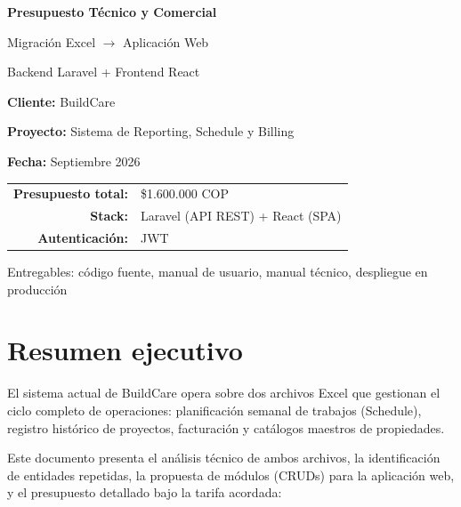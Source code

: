 \documentclass[11pt,a4paper]{article}
\newcommand{\money}[1]{\$#1}
\begin{document}
\begin{titlepage}
    \centering
    \vspace*{2cm}
    {\Huge\bfseries\color{buildcare} Presupuesto T\'ecnico y Comercial\par}
    \vspace{0.8cm}
    {\LARGE Migraci\'on Excel $\rightarrow$ Aplicaci\'on Web\par}
    \vspace{0.5cm}
    {\Large Backend Laravel + Frontend React\par}
    \vspace{2cm}
    {\large\textbf{Cliente:} BuildCare\par}
    \vspace{0.3cm}
    {\large\textbf{Proyecto:} Sistema de Reporting, Schedule y Billing\par}
    \vspace{0.3cm}
    {\large\textbf{Fecha:} Septiembre 2026\par}
    \vfill
    \begin{tabular}{rl}
        \textbf{Presupuesto total:} & \money{1.600.000} COP \\
        \textbf{Stack:} & Laravel (API REST) + React (SPA) \\
        \textbf{Autenticaci\'on:} & JWT \\
    \end{tabular}
    \vspace{1.5cm}
    {\small Entregables: c\'odigo fuente, manual de usuario, manual t\'ecnico, despliegue en producci\'on\par}
\end{titlepage}

\tableofcontents
\newpage

\section{Resumen ejecutivo}

El sistema actual de BuildCare opera sobre dos archivos Excel que gestionan el ciclo completo de operaciones: planificaci\'on semanal de trabajos (Schedule), registro hist\'orico de proyectos, facturaci\'on y cat\'alogos maestros de propiedades.

Este documento presenta el an\'alisis t\'ecnico de ambos archivos, la identificaci\'on de entidades repetidas, la propuesta de m\'odulos (CRUDs) para la aplicaci\'on web, y el presupuesto detallado bajo la tarifa acordada:
\end{document}
